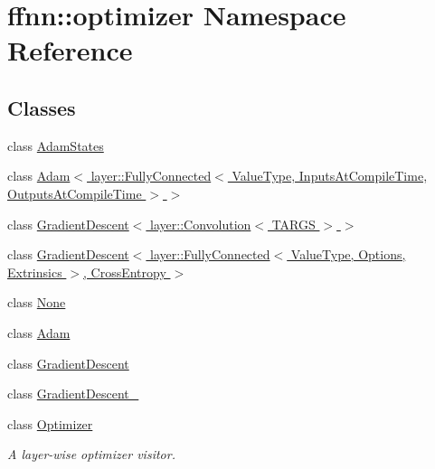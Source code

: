 \hypertarget{namespaceffnn_1_1optimizer}{\section{ffnn\-:\-:optimizer Namespace Reference}
\label{namespaceffnn_1_1optimizer}
}
\subsection*{Classes}
\begin{DoxyCompactItemize}
\item 
class \hyperlink{classffnn_1_1optimizer_1_1_adam_states}{Adam\-States}
\item 
class \hyperlink{classffnn_1_1optimizer_1_1_adam_3_01layer_1_1_fully_connected_3_01_value_type_00_01_inputs_at_co08ce471fd3ee7441a350cc42cfd35bcd}{Adam$<$ layer\-::\-Fully\-Connected$<$ Value\-Type, Inputs\-At\-Compile\-Time, Outputs\-At\-Compile\-Time $>$ $>$}
\item 
class \hyperlink{classffnn_1_1optimizer_1_1_gradient_descent_3_01layer_1_1_convolution_3_01_t_a_r_g_s_01_4_01_4}{Gradient\-Descent$<$ layer\-::\-Convolution$<$ T\-A\-R\-G\-S $>$ $>$}
\item 
class \hyperlink{classffnn_1_1optimizer_1_1_gradient_descent_3_01layer_1_1_fully_connected_3_01_value_type_00_01_5467194c2be34d4b726502ad96dff6d3}{Gradient\-Descent$<$ layer\-::\-Fully\-Connected$<$ Value\-Type, Options, Extrinsics $>$, Cross\-Entropy $>$}
\item 
class \hyperlink{classffnn_1_1optimizer_1_1_none}{None}
\item 
class \hyperlink{classffnn_1_1optimizer_1_1_adam}{Adam}
\item 
class \hyperlink{classffnn_1_1optimizer_1_1_gradient_descent}{Gradient\-Descent}
\item 
class \hyperlink{classffnn_1_1optimizer_1_1_gradient_descent__}{Gradient\-Descent\-\_\-}
\item 
class \hyperlink{classffnn_1_1optimizer_1_1_optimizer}{Optimizer}
\begin{DoxyCompactList}\small\item\em A layer-\/wise optimizer visitor. \end{DoxyCompactList}\end{DoxyCompactItemize}
